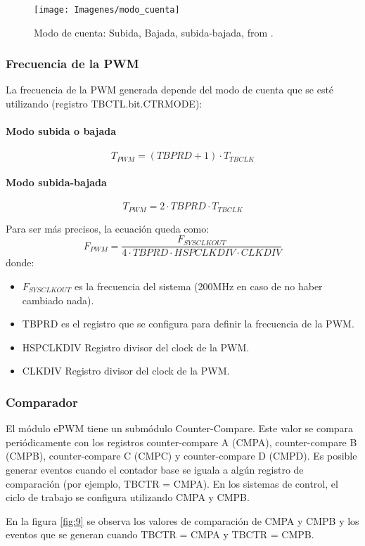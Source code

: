 \begin{figure}[H]
	\centering
	\texttt{[image: Imagenes/modo\_cuenta]}
	\caption{Modo de cuenta: Subida, Bajada, subida-bajada, from \cite[page 1874]{tmr}.}
	\label{fig:8}
\end{figure}
\subsubsection{Frecuencia de la PWM}

La frecuencia de la PWM generada depende del modo de cuenta que se esté utilizando (registro TBCTL.bit.CTRMODE):
\paragraph*{Modo subida o bajada}
$$T_{PWM} = (TBPRD + 1) \cdot T_{TBCLK}$$

\paragraph*{Modo subida-bajada}
$$T_{PWM} = 2 \cdot TBPRD \cdot T_{TBCLK}$$

Para ser más precisos, la ecuación queda como:
$$F_{PWM} = \frac{F_{SYSCLKOUT}}{4 \cdot TBPRD \cdot HSPCLKDIV \cdot CLKDIV} $$
donde:
\begin{itemize}
	\item $F_{SYSCLKOUT}$ es la frecuencia del sistema (200MHz en caso de no haber cambiado nada).
	\item TBPRD es el registro que se configura para definir la frecuencia de la PWM.
	\item HSPCLKDIV Registro divisor del clock de la PWM.
	\item CLKDIV Registro divisor del clock de la PWM.
\end{itemize}

\subsubsection{Comparador}
El módulo ePWM tiene un submódulo Counter-Compare. Este valor se compara periódicamente con los registros counter-compare A (CMPA), counter-compare B (CMPB), counter-compare C (CMPC) y counter-compare D (CMPD). Es posible generar eventos cuando el contador base se iguala a algún registro de comparación (por ejemplo, TBCTR = CMPA).
En los sistemas de control, el ciclo de trabajo se configura utilizando CMPA y CMPB.

En la figura \ref{fig:9} se observa los valores de comparación de CMPA y CMPB y los eventos que se generan cuando TBCTR = CMPA y TBCTR = CMPB.

